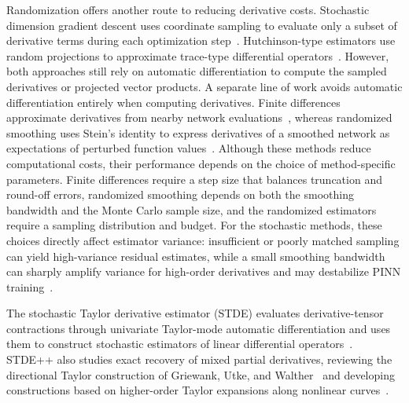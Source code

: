 \documentclass[final,oneeqnum]{siamltex}
\begin{document}
Randomization offers another route to reducing derivative costs.
Stochastic dimension gradient descent uses coordinate sampling to evaluate only a subset of derivative terms during each optimization step~\cite{Hu2023sdgd}.
Hutchinson-type estimators use random projections to approximate trace-type differential operators~\cite{Hutchinson1989,Pearlmutter1994,Hu2024hte}.
However, both approaches still rely on automatic differentiation to compute the sampled derivatives or projected vector products.
A separate line of work avoids automatic differentiation entirely when computing derivatives.
Finite differences approximate derivatives from nearby network evaluations~\cite{Fornberg1988,Chiu2022CAN}, whereas randomized smoothing uses Stein's identity to express derivatives of a smoothed network as expectations of perturbed function values~\cite{Stein1981,He2023}.
Although these methods reduce computational costs, their performance depends on the choice of method-specific parameters.
Finite differences require a step size that balances truncation and round-off errors, randomized smoothing depends on both the smoothing bandwidth and the Monte Carlo sample size, and the randomized estimators require a sampling distribution and budget.
For the stochastic methods, these choices directly affect estimator variance: insufficient or poorly matched sampling can yield high-variance residual estimates, while a small smoothing bandwidth can sharply amplify variance for high-order derivatives and may destabilize PINN training~\cite{He2023,Hu2025bias,Shi2026stdepp}.

The stochastic Taylor derivative estimator (STDE) evaluates derivative-tensor contractions through univariate Taylor-mode automatic differentiation and uses them to construct stochastic estimators of linear differential operators~\cite{Shi2024stde}.
STDE++ also studies exact recovery of mixed partial derivatives, reviewing the directional Taylor construction of Griewank, Utke, and Walther~\cite{GriewankUtkeWalther2000} and developing constructions based on higher-order Taylor expansions along nonlinear curves~\cite{Shi2026stdepp}.
\end{document}
